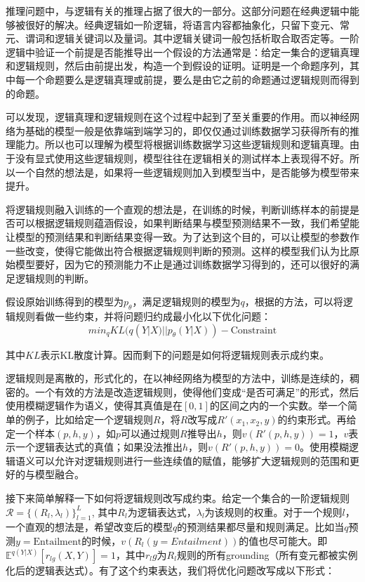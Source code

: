 \documentclass[UTF8,11pt,a4paper,nofonts]{ctexart}
\begin{document}
推理问题中，与逻辑有关的推理占据了很大的一部分。这部分问题在经典逻辑中能够被很好的解决。经典逻辑如一阶逻辑，将语言内容都抽象化，只留下变元、常元、谓词和逻辑关键词以及量词。其中逻辑关键词一般包括析取合取否定等。一阶逻辑中验证一个前提是否能推导出一个假设的方法通常是：给定一集合的逻辑真理和逻辑规则，然后由前提出发，构造一个到假设的证明。证明是一个命题序列，其中每一个命题要么是逻辑真理或前提，要么是由它之前的命题通过逻辑规则而得到的命题。

可以发现，逻辑真理和逻辑规则在这个过程中起到了至关重要的作用。而以神经网络为基础的模型一般是依靠端到端学习的，即仅仅通过训练数据学习获得所有的推理能力。所以也可以理解为模型将根据训练数据学习这些逻辑规则和逻辑真理。由于没有显式使用这些逻辑规则，模型往往在逻辑相关的测试样本上表现得不好。所以一个自然的想法是，如果将一些逻辑规则加入到模型当中，是否能够为模型带来提升。



将逻辑规则融入训练的一个直观的想法是，在训练的时候，判断训练样本的前提是否可以根据逻辑规则蕴涵假设，如果判断结果与模型预测结果不一致，我们希望能让模型的预测结果和判断结果变得一致。为了达到这个目的，可以让模型的参数作一些改变，使得它能做出符合根据逻辑规则判断的预测。这样的模型我们认为比原始模型要好，因为它的预测能力不止是通过训练数据学习得到的，还可以很好的满足逻辑规则的判断。

假设原始训练得到的模型为$p_\theta$，满足逻辑规则的模型为$q$，根据\cite{}的方法，可以将逻辑规则看做一些约束，并将问题归约成最小化以下优化问题：
\begin{equation}
min_{q} KL(q(Y|X) || p_\theta(Y|X)) - \text{Constraint}
\end{equation}

其中$KL$表示KL散度计算\cite{}。因而剩下的问题是如何将逻辑规则表示成约束。

逻辑规则是离散的，形式化的，在以神经网络为模型的方法中，训练是连续的，稠密的。一个有效的方法是改造逻辑规则，使得他们变成“是否可满足”的形式，然后使用模糊逻辑作为语义，使得其真值是在$[0,1]$的区间之内的一个实数。举一个简单的例子，比如给定一个逻辑规则$R$，将$R$改写成$R'(x_1,x_2,y)$的约束形式。再给定一个样本$(p,h,y)$，如$p$可以通过规则$R$推导出$h$，则$v(R'(p,h,y))=1$，$v$表示一个逻辑表达式的真值；如果没法推出$h$，则$v(R'(p,h,y))=0$。使用模糊逻辑语义可以允许对逻辑规则进行一些连续值的赋值，能够扩大逻辑规则的范围和更好的与模型融合。

接下来简单解释一下如何将逻辑规则改写成约束。给定一个集合的一阶逻辑规则$\mathcal{R}=\{(R_l,\lambda_l)\}^L_{l=1}$, 其中$R_l$为逻辑表达式，$\lambda_l$为该规则的权重。对于一个规则$l$，一个直观的想法是，希望改变后的模型$q$的预测结果都尽量和规则满足。比如当$q$预测$y=\text{Entailment}$的时候，$v(R_l(y=Entailment))$的值也尽可能大。即$\mathbb{E}^{q(Y|X)}[r_{lg}(X,Y)]=1$，其中$r_lg$为$R_l$规则的所有grounding（所有变元都被实例化后的逻辑表达式）。有了这个约束表达，我们将优化问题改写成以下形式：
\end{document}
